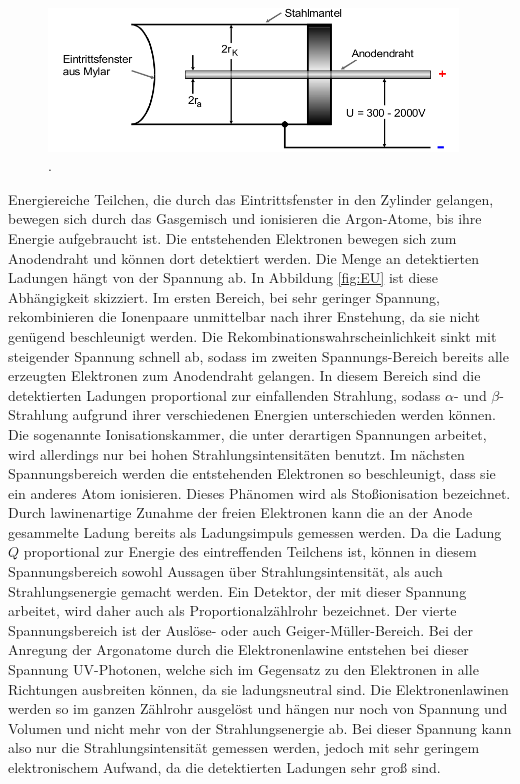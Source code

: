 \begin{figure}
  \centering
  \includegraphics[height=3.8cm]{MeinePics;)/GMZ.png}
  \caption{.\cite{anleitung}}
  \label{fig:GMZ}
\end{figure}

\FloatBarrier

Energiereiche Teilchen, die durch das Eintrittsfenster in den Zylinder
gelangen,
bewegen sich durch das Gasgemisch und ionisieren die Argon-Atome,
bis ihre Energie aufgebraucht ist. Die entstehenden
Elektronen bewegen sich zum Anodendraht und können dort detektiert werden.
Die Menge an detektierten Ladungen hängt von der Spannung ab.
In Abbildung \ref{fig:EU} ist diese Abhängigkeit skizziert.
Im ersten Bereich, bei sehr geringer Spannung, rekombinieren die Ionenpaare
unmittelbar nach ihrer Enstehung, da sie nicht genügend beschleunigt werden.
Die Rekombinationswahrscheinlichkeit sinkt mit steigender Spannung schnell ab,
sodass im zweiten Spannungs-Bereich bereits alle erzeugten Elektronen zum
Anodendraht gelangen. In diesem Bereich sind die detektierten Ladungen
proportional zur einfallenden Strahlung, sodass $\alpha$- und $\beta$-Strahlung
aufgrund ihrer verschiedenen Energien unterschieden werden können.
Die sogenannte Ionisationskammer, die unter derartigen Spannungen
arbeitet, wird allerdings nur bei hohen Strahlungsintensitäten benutzt.
Im nächsten Spannungsbereich werden die entstehenden Elektronen so beschleunigt,
dass sie ein anderes Atom ionisieren. Dieses Phänomen wird als
Stoßionisation bezeichnet.
Durch lawinenartige Zunahme der freien Elektronen kann die an der Anode
gesammelte Ladung bereits als Ladungsimpuls gemessen werden. Da die
Ladung $Q$ proportional zur Energie des eintreffenden Teilchens ist, können
in diesem Spannungsbereich sowohl Aussagen über Strahlungsintensität, als auch
Strahlungsenergie gemacht werden. Ein Detektor, der mit dieser Spannung
arbeitet, wird daher auch als Proportionalzählrohr bezeichnet.
Der vierte Spannungsbereich ist der Auslöse- oder auch Geiger-Müller-Bereich.
Bei der Anregung der Argonatome durch die Elektronenlawine entstehen bei dieser
Spannung UV-Photonen, welche sich im Gegensatz zu den Elektronen in alle
Richtungen ausbreiten können, da sie ladungsneutral sind. Die Elektronenlawinen
werden so im ganzen Zählrohr ausgelöst und hängen nur noch von Spannung und
Volumen und nicht mehr von der Strahlungsenergie ab. Bei dieser Spannung
kann also nur die Strahlungsintensität gemessen werden, jedoch mit sehr
geringem elektronischem Aufwand, da die detektierten Ladungen sehr groß sind.

